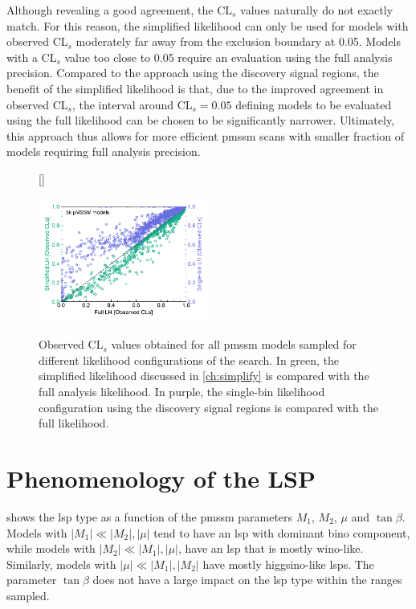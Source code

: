 Although revealing a good agreement, the CL$_s$ values naturally do not exactly match. For this reason, the simplified likelihood can only be used for models with observed CL$_s$ moderately far away from the exclusion boundary at 0.05. Models with a CL$_s$ value too close to 0.05 require an evaluation using the full analysis precision. Compared to the approach using the discovery signal regions, the benefit of the simplified likelihood is that, due to the improved agreement in observed CL$_s$, the interval around CL$_s=0.05$ defining models to be evaluated using the full likelihood can be chosen to be significantly narrower. Ultimately, this approach thus allows for more efficient \gls{pmssm} scans with smaller fraction of models requiring full analysis precision.
\begin{figure}[H]
[\FBwidth]
{\caption{Observed CL$_s$ values obtained for all \gls{pmssm} models sampled for different likelihood configurations of the \onelepton search. In green, the simplified likelihood discussed in \cref{ch:simplify} is compared with the full analysis likelihood. In purple, the single-bin likelihood configuration using the discovery signal regions is compared with the full likelihood.}\label{fig:validation_simplified_full_likelihood}}
{\includegraphics[width=0.5\textwidth]{fig_scatter_likelihoods}}
\end{figure}

\FloatBarrier

\section{Phenomenology of the LSP}

 shows the \gls{lsp} type as a function of the \gls{pmssm} parameters $M_1$, $M_2$, $\mu$ and $\tan\beta$. Models with $\vert M_1\vert \ll \vert M_2\vert, \vert\mu\vert$ tend to have an \gls{lsp} with dominant bino component, while models with $\vert M_2 \vert \ll \vert M_1 \vert, \vert\mu\vert$, have an \gls{lsp} that is mostly wino-like.
Similarly, models with $\vert\mu\vert\ll \vert M_1 \vert, \vert M_2 \vert$ have mostly higgsino-like \glspl{lsp}.
The parameter $\tan\beta$ does not have a large impact on the \gls{lsp} type within the ranges sampled.

